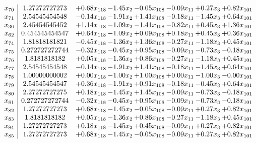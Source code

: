 \documentclass[8pt]{article}
\begin{document}
\[\begin{array}{c| c c@{\hskip 2pt} c@{\hskip 2pt} c@{\hskip 2pt} c@{\hskip 2pt} c@{\hskip 2pt} c@{\hskip 2pt} }
 x_{70}   &  1.27272727273 & +  0.68 x_{118} & -1.45 x_{2} & -0.05 x_{108} & -0.09 x_{11} & +  0.27 x_{3} & +  0.82 x_{101}\\
 x_{71}   &  2.54545454548 & -0.14 x_{118} & -1.91 x_{2} & +  1.41 x_{108} & -0.18 x_{11} & -1.45 x_{3} & +  0.64 x_{101}\\
 x_{36}   &  2.45454545452 & +  1.14 x_{118} & -1.09 x_{2} & -1.41 x_{108} & -0.82 x_{11} & +  0.45 x_{3} & +  1.36 x_{101}\\
 x_{62}   &  0.454545454547 & +  0.64 x_{118} & -1.09 x_{2} & +  0.09 x_{108} & +  0.18 x_{11} & +  0.45 x_{3} & +  0.36 x_{101}\\
 x_{74}   &  1.81818181821 & -0.45 x_{118} & -1.36 x_{2} & +  1.36 x_{108} & -0.27 x_{11} & -1.18 x_{3} & +  0.45 x_{101}\\
 x_{75}   &  0.272727272744 & -0.32 x_{118} & -0.45 x_{2} & +  0.95 x_{108} & -0.09 x_{11} & -0.73 x_{3} & -0.18 x_{101}\\
 x_{76}   &  1.8181818182 & +  0.05 x_{118} & -1.36 x_{2} & +  0.86 x_{108} & -0.27 x_{11} & -1.18 x_{3} & +  0.45 x_{101}\\
 x_{77}   &  2.54545454548 & -0.14 x_{118} & -1.91 x_{2} & +  1.41 x_{108} & -0.18 x_{11} & -1.45 x_{3} & +  0.64 x_{101}\\
 x_{78}   &  1.00000000002 & +  0.00 x_{118} & -1.00 x_{2} & +  1.00 x_{108} & +  0.00 x_{11} & -1.00 x_{3} & -0.00 x_{101}\\
 x_{79}   &  2.54545454547 & +  0.36 x_{118} & -1.91 x_{2} & +  0.91 x_{108} & -0.18 x_{11} & -0.45 x_{3} & +  0.64 x_{101}\\
 x_{80}   &  2.27272727275 & +  0.18 x_{118} & -1.45 x_{2} & +  1.45 x_{108} & -0.09 x_{11} & -0.73 x_{3} & -0.18 x_{101}\\
 x_{81}   &  0.272727272744 & -0.32 x_{118} & -0.45 x_{2} & +  0.95 x_{108} & -0.09 x_{11} & -0.73 x_{3} & -0.18 x_{101}\\
 x_{82}   &  1.27272727273 & +  0.68 x_{118} & -1.45 x_{2} & -0.05 x_{108} & -0.09 x_{11} & +  0.27 x_{3} & +  0.82 x_{101}\\
 x_{83}   &  1.8181818182 & +  0.05 x_{118} & -1.36 x_{2} & +  0.86 x_{108} & -0.27 x_{11} & -1.18 x_{3} & +  0.45 x_{101}\\
 x_{84}   &  1.27272727273 & +  0.18 x_{118} & -1.45 x_{2} & +  0.45 x_{108} & -0.09 x_{11} & +  0.27 x_{3} & +  0.82 x_{101}\\
 x_{85}   &  1.27272727273 & +  0.68 x_{118} & -1.45 x_{2} & -0.05 x_{108} & -0.09 x_{11} & +  0.27 x_{3} & +  0.82 x_{101}\\

\end{array}\]
\end{document}
